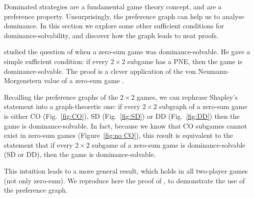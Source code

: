 \documentclass[preprint,authoryear]{elsarticle}
\begin{document}
Dominated strategies are a fundamental game theory concept, and are a preference property. Unsurprisingly, the preference graph can help us to analyse dominance. In this section we explore some other sufficient conditions for dominance-solvability, and discover how the graph leads to neat proofs.

\cite{shapley_topics_1964} studied the question of when a zero-sum game was dominance-solvable. He gave a simple sufficient condition: if every $2\times 2$ subgame has a PNE, then the game is dominance-solvable. The proof is a clever application of the von Neumann-Morgenstern value of a zero-sum game \citep{von2007theory}.

Recalling the preference graphs of the $2\times 2$ games, we can rephrase Shapley's statement into a graph-theoretic one: if every $2\times 2$ subgraph of a zero-sum game is either CO (Fig.~\ref{fig:CO}), SD (Fig.~\ref{fig:SD}) or DD (Fig.~\ref{fig:DD}) then the game is dominance-solvable. In fact, because we know that CO subgames cannot exist in zero-sum games (Figure~\ref{fig:no CO}), this result is equivalent to the statement that if every $2\times 2$ subgame of a zero-sum game is dominance-solvable (SD or DD), then the game is dominance-solvable.

This intuition leads to a more general result, which holds in all two-player games (not only zero-sum). We reproduce here the proof of \cite{biggar_graph_2023}, to demonstrate the use of the preference graph.
\end{document}
